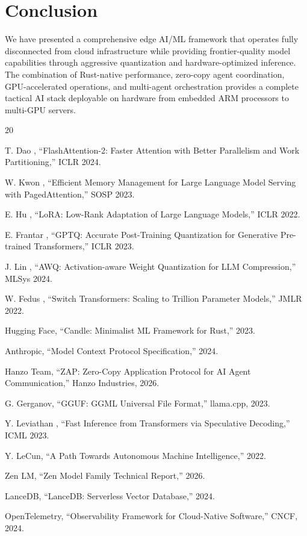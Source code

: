 \documentclass[11pt,letterpaper]{article}
\begin{document}
\section{Conclusion}

We have presented a comprehensive edge AI/ML framework that operates fully disconnected from cloud infrastructure while providing frontier-quality model capabilities through aggressive quantization and hardware-optimized inference. The combination of Rust-native performance, zero-copy agent coordination, GPU-accelerated operations, and multi-agent orchestration provides a complete tactical AI stack deployable on hardware from embedded ARM processors to multi-GPU servers.

\begin{thebibliography}{20}

 T. Dao \etal, ``FlashAttention-2: Faster Attention with Better Parallelism and Work Partitioning,'' ICLR 2024.

 W. Kwon \etal, ``Efficient Memory Management for Large Language Model Serving with PagedAttention,'' SOSP 2023.

 E. Hu \etal, ``LoRA: Low-Rank Adaptation of Large Language Models,'' ICLR 2022.

 E. Frantar \etal, ``GPTQ: Accurate Post-Training Quantization for Generative Pre-trained Transformers,'' ICLR 2023.

 J. Lin \etal, ``AWQ: Activation-aware Weight Quantization for LLM Compression,'' MLSys 2024.

 W. Fedus \etal, ``Switch Transformers: Scaling to Trillion Parameter Models,'' JMLR 2022.

 Hugging Face, ``Candle: Minimalist ML Framework for Rust,'' 2023.

 Anthropic, ``Model Context Protocol Specification,'' 2024.

 Hanzo Team, ``ZAP: Zero-Copy Application Protocol for AI Agent Communication,'' Hanzo Industries, 2026.

 G. Gerganov, ``GGUF: GGML Universal File Format,'' llama.cpp, 2023.

 Y. Leviathan \etal, ``Fast Inference from Transformers via Speculative Decoding,'' ICML 2023.

 Y. LeCun, ``A Path Towards Autonomous Machine Intelligence,'' 2022.

 Zen LM, ``Zen Model Family Technical Report,'' 2026.

 LanceDB, ``LanceDB: Serverless Vector Database,'' 2024.

 OpenTelemetry, ``Observability Framework for Cloud-Native Software,'' CNCF, 2024.

\end{thebibliography}
\end{document}
